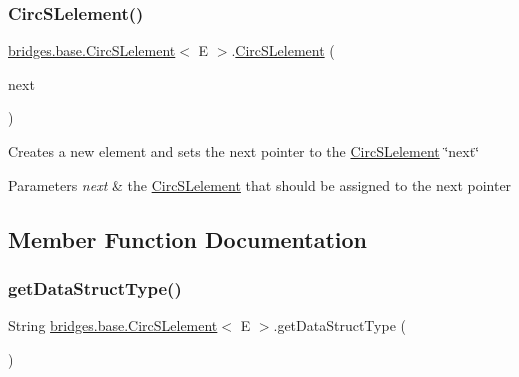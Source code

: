 \subsubsection{\texorpdfstring{Circ\+S\+Lelement()}{CircSLelement()}\hspace{0.1cm}{\footnotesize\ttfamily [4/4]}}
{\footnotesize\ttfamily \mbox{\hyperlink{classbridges_1_1base_1_1_circ_s_lelement}{bridges.\+base.\+Circ\+S\+Lelement}}$<$ E $>$.\mbox{\hyperlink{classbridges_1_1base_1_1_circ_s_lelement}{Circ\+S\+Lelement}} (\begin{DoxyParamCaption}\item[{\mbox{\hyperlink{classbridges_1_1base_1_1_circ_s_lelement}{Circ\+S\+Lelement}}$<$ E $>$}]{next }\end{DoxyParamCaption})}

Creates a new element and sets the next pointer to the \mbox{\hyperlink{classbridges_1_1base_1_1_circ_s_lelement}{Circ\+S\+Lelement}} \char`\"{}next\char`\"{}


\begin{DoxyParams}{Parameters}
{\em next} & the \mbox{\hyperlink{classbridges_1_1base_1_1_circ_s_lelement}{Circ\+S\+Lelement}} that should be assigned to the next pointer \\
\hline
\end{DoxyParams}


\subsection{Member Function Documentation}
\mbox{\label{classbridges_1_1base_1_1_circ_s_lelement_ad56acddc52e8e0b6869a6f24f1e0a90e}} 
\subsubsection{\texorpdfstring{get\+Data\+Struct\+Type()}{getDataStructType()}}
{\footnotesize\ttfamily String \mbox{\hyperlink{classbridges_1_1base_1_1_circ_s_lelement}{bridges.\+base.\+Circ\+S\+Lelement}}$<$ E $>$.get\+Data\+Struct\+Type (\begin{DoxyParamCaption}{ }\end{DoxyParamCaption})}


